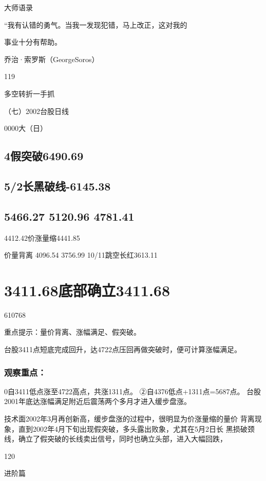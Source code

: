 \documentclass{article}
\begin{document}
大师语录

“我有认错的勇气。当我一发现犯错，马上改正，这对我的

事业十分有帮助。

乔治·索罗斯（GeorgeSoros）

119

\clearpage

多空转折一手抓

（七）2002台股日线

0000大（日）

\subsection{4假突破6490.69}

\subsection{5/2长黑破线-6145.38}

\subsection{5466.27 5120.96 4781.41}

4412.42价涨量缩4441.85

价量背离 4096.54 3756.99 10/11跳空长红3613.11

\section{3411.68底部确立3411.68}

610768

重点提示：量价背离、涨幅满足、假突破。

台股3411点短底完成回升，达4722点压回再做突破时，便可计算涨幅满足。

\subsubsection{观察重点：}

0自3411低点涨至4722高点，共涨1311点。 ②自4376低点+1311点=5687点。 台股2001年底达涨幅满足附近后震荡两个多月才进入缓步盘涨。

技术面2002年3月再创新高，缓步盘涨的过程中，很明显为价涨量缩的量价 背离现象，直到2002年4月下旬出现假突破，多头露出败象，尤其在5月2日长 黑损破颈线，确立了假突破的长线卖出信号，同时也确立头部，进入大幅回跌，

120

\clearpage

进阶篇
\end{document}
